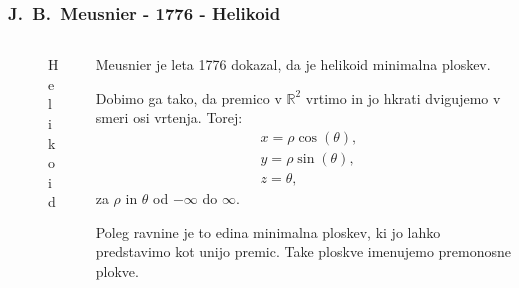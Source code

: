\documentclass[8pt]{beamer}
\newcommand{\samplescalar}{50} %
\theoremstyle{definition}
\theoremstyle{remark}
\theoremstyle{plain}
\numberwithin{equation}{section}  %
\begin{document}
\begin{frame}
    \frametitle{J.~B.~Meusnier - 1776 - Helikoid}
    \begin{columns}
        \begin{column}{0.5\textwidth}
            \centering
            \begin{figure}[H]
                \centering
            
                \caption{Helikoid}
            \end{figure}
        \end{column}

        \begin{column}{0.5\textwidth}
            Meusnier je leta 1776 dokazal, da je helikoid minimalna ploskev. 
            \pause 
            \vspace{0.8em}

            Dobimo ga tako, da premico v $\mathbb{R}^2$ vrtimo in jo hkrati dvigujemo v smeri osi vrtenja. Torej:
            \begin{align*}
                & x=\rho \cos (\theta), \\
                & y=\rho \sin (\theta), \\
                & z=\theta,
            \end{align*}
            za $\rho$ in $\theta$ od $-\infty$ do $\infty$.
            \pause 
            \vspace{0.8em}
            
            Poleg ravnine je to edina minimalna ploskev, ki jo lahko predstavimo kot unijo premic. Take ploskve imenujemo \textcolor{red1}{premonosne plokve}.
            
        \end{column}
    \end{columns}
\end{frame}
\end{document}
